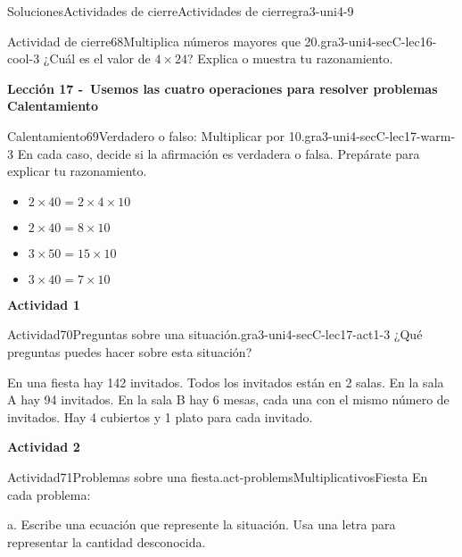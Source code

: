 \documentclass[twoside,10pt,]{article}
\begin{document}
\begin{solutions-section}{Soluciones}{Actividades de cierre}{}{Actividades de cierre}{}{}{gra3-uni4-9}
\begin{projectsolution}{Actividad de cierre}{68}{Multiplica números mayores que 20.}{gra3-uni4-secC-lec16-cool-3}%
¿Cuál es el valor de \(4\times 24\)? Explica o muestra tu razonamiento.%
\end{projectsolution}%
\par\medskip
\noindent\textbf{\large{}\space\textperiodcentered\space{}Lección 17 -~Usemos las cuatro operaciones para resolver problemas\\
\space\textperiodcentered\space{}Calentamiento}
\begin{explorationsolution}{Calentamiento}{69}{Verdadero o falso: Multiplicar por 10.}{gra3-uni4-secC-lec17-warm-3}%
En cada caso, decide si la afirmación es verdadera o falsa. Prepárate para explicar tu razonamiento.%
%
\begin{itemize}[label=\textbullet]
\item{}\(\displaystyle 2 \times 40 = 2 \times 4 \times 10\)%
\item{}\(\displaystyle 2 \times 40 = 8 \times 10\)%
\item{}\(\displaystyle 3 \times 50 = 15 \times 10\)%
\item{}\(\displaystyle 3 \times 40 = 7 \times 10\)%
\end{itemize}
\end{explorationsolution}%
\par\medskip
\noindent\textbf{\large{}\space\textperiodcentered\space{}Actividad 1}
\begin{activitysolution}{Actividad}{70}{Preguntas sobre una situación.}{gra3-uni4-secC-lec17-act1-3}%
¿Qué preguntas puedes hacer sobre esta situación?%
\par
En una fiesta hay 142 invitados. Todos los invitados están en 2 salas. En la sala A hay 94 invitados. En la sala B hay 6 mesas, cada una con el mismo número de invitados. Hay 4 cubiertos y 1 plato para cada invitado.%
\end{activitysolution}%
\par\medskip
\noindent\textbf{\large{}\space\textperiodcentered\space{}Actividad 2}
\begin{activitysolution}{Actividad}{71}{Problemas sobre una fiesta.}{act-problemsMultiplicativosFiesta}%
En cada problema:%
\begin{sidebyside}{2}{0}{0}{0}%
\begin{sbspanel}{0.6}%
a. Escribe una ecuación que represente la situación. Usa una letra para representar la cantidad desconocida.%
\par

\end{sbspanel}
\end{sidebyside}
\end{activitysolution}
\end{solutions-section}
\end{document}
